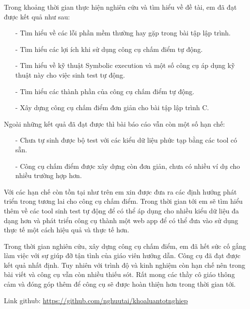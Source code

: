 \documentclass[12pt,a4paper]{report}
\begin{document}
Trong khoảng thời gian thực hiện nghiên cứu và tìm hiểu về đề tài, em đã đạt được kết quả như sau:

\begin{itemize}
\item[-] Tìm hiểu về các lỗi phần mềm thường hay gặp trong bài tập lập trình.
\item[-] Tìm hiểu  các lợi ích khi sử dụng công cụ chấm điểm tự động.
\item[-] Tìm hiểu về kỹ thuật Symbolic execution và một số công cụ áp dụng kỹ thuật này cho việc sinh test tự động.
\item[-] Tìm hiểu các thành phần của công cụ chấm điểm tự động.
\item[-] Xây dựng công cụ chấm điểm đơn giản cho bài tập lập trình C.
\end{itemize}

Ngoài những kết quả đã đạt được thì bài báo cáo vẫn còn một số hạn chế:

\begin{itemize}
\item[-] Chưa tự sinh được bộ test với các kiểu dữ liệu phức tạp bằng các tool có sẵn.
\item[-] Công cụ chấm điểm được xây dựng còn đơn giản, chưa có nhiều ví dụ cho nhiều trường hợp hơn.
\end{itemize}

Với các hạn chế còn tồn tại như trên em xin được đưa ra các định hướng phát triển trong tương lai cho công cụ chấm điểm. Trong thời gian tới em sẽ tìm hiểu thêm về các tool sinh test tự động để có thể áp dụng cho nhiều kiểu dữ liệu đa dạng hơn và phát triển công cụ thành một web app để có thể đưa vào sử dụng thực tế một cách hiệu quả và thực tế hơn.

Trong thời gian nghiên cứu, xây dựng công cụ chấm điểm, em đã hết sức cố gắng làm việc với sự giúp đỡ tận tình của giáo viên hướng dẫn. Công cụ đã đạt được kết quả nhất định. Tuy nhiên với trình độ và kinh nghiệm còn hạn chế nên trong bài viết và công cụ vẫn còn nhiều thiếu sót. Rất mong các thầy cô giáo thông cảm và đóng góp thêm để công cụ sẽ được hoàn thiện hơn trong thời gian tới.

Link github: \href{https://github.com/nghuutai/khoaluantotnghiep}{https://github.com/nghuutai/khoaluantotnghiep}

\newpage




\end{document}

